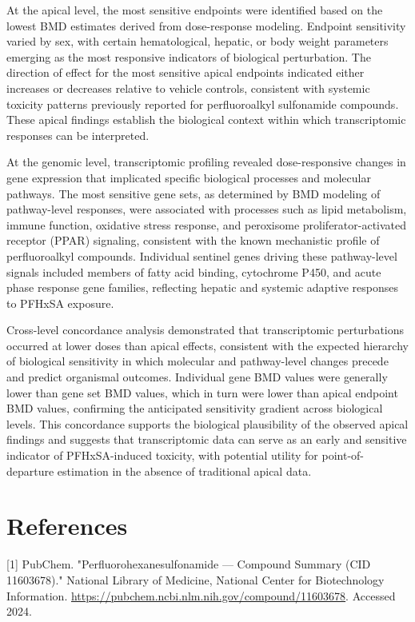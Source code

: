 At the apical level, the most sensitive endpoints were identified based on the lowest BMD estimates derived from dose-response modeling. Endpoint sensitivity varied by sex, with certain hematological, hepatic, or body weight parameters emerging as the most responsive indicators of biological perturbation. The direction of effect for the most sensitive apical endpoints indicated either increases or decreases relative to vehicle controls, consistent with systemic toxicity patterns previously reported for perfluoroalkyl sulfonamide compounds. These apical findings establish the biological context within which transcriptomic responses can be interpreted.

At the genomic level, transcriptomic profiling revealed dose-responsive changes in gene expression that implicated specific biological processes and molecular pathways. The most sensitive gene sets, as determined by BMD modeling of pathway-level responses, were associated with processes such as lipid metabolism, immune function, oxidative stress response, and peroxisome proliferator-activated receptor (PPAR) signaling, consistent with the known mechanistic profile of perfluoroalkyl compounds. Individual sentinel genes driving these pathway-level signals included members of fatty acid binding, cytochrome P450, and acute phase response gene families, reflecting hepatic and systemic adaptive responses to PFHxSA exposure.

Cross-level concordance analysis demonstrated that transcriptomic perturbations occurred at lower doses than apical effects, consistent with the expected hierarchy of biological sensitivity in which molecular and pathway-level changes precede and predict organismal outcomes. Individual gene BMD values were generally lower than gene set BMD values, which in turn were lower than apical endpoint BMD values, confirming the anticipated sensitivity gradient across biological levels. This concordance supports the biological plausibility of the observed apical findings and suggests that transcriptomic data can serve as an early and sensitive indicator of PFHxSA-induced toxicity, with potential utility for point-of-departure estimation in the absence of traditional apical data.

\section{References}

[1] PubChem. "Perfluorohexanesulfonamide — Compound Summary (CID 11603678)." National Library of Medicine, National Center for Biotechnology Information. \url{https://pubchem.ncbi.nlm.nih.gov/compound/11603678}. Accessed 2024.

